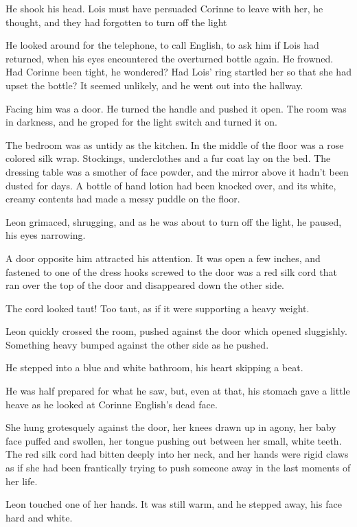 \documentclass{novel}
\begin{document}
He shook his head. Lois must have persuaded Corinne to leave with her, he thought, and they had forgotten to turn off the light

He looked around for the telephone, to call English, to ask him if Lois had returned, when his eyes encountered the overturned bottle again. He frowned. Had Corinne been tight, he wondered? Had Lois' ring startled her so that she had upset the bottle? It seemed unlikely, and he went out into the hallway.

Facing him was a door. He turned the handle and pushed it open. The room was in darkness, and he groped for the light switch and turned it on.

The bedroom was as untidy as the kitchen. In the middle of the floor was a rose colored silk wrap. Stockings, underclothes and a fur coat lay on the bed. The dressing table was a smother of face powder, and the mirror above it hadn't been dusted for days. A bottle of hand lotion had been knocked over, and its white, creamy contents had made a messy puddle on the floor.

Leon grimaced, shrugging, and as he was about to turn off the light, he paused, his eyes narrowing.

A door opposite him attracted his attention. It was open a few inches, and fastened to one of the dress hooks screwed to the door was a red silk cord that ran over the top of the door and disappeared down the other side.

The cord looked taut! Too taut, as if it were supporting a heavy weight.

Leon quickly crossed the room, pushed against the door which opened sluggishly. Something heavy bumped against the other side as he pushed.

He stepped into a blue and white bathroom, his heart skipping a beat.

He was half prepared for what he saw, but, even at that, his stomach gave a little heave as he looked at Corinne English's dead face.

She hung grotesquely against the door, her knees drawn up in agony, her baby face puffed and swollen, her tongue pushing out between her small, white teeth. The red silk cord had bitten deeply into her neck, and her hands were rigid claws as if she had been frantically trying to push someone away in the last moments of her life.

Leon touched one of her hands. It was still warm, and he stepped away, his face hard and white.
\end{document}

